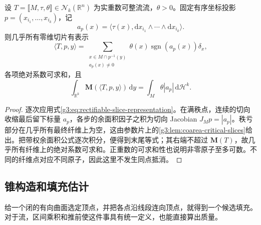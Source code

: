 \begin{corollary}\label{g3:cor:coordinate-slice-atoms}
	设 \(T=\lBrack M,\tau,\theta\rBrack\in\mathcal N_k(\mathbb R^n)\) 为实重数可整流流，\(\theta>0\)。固定有序坐标投影 \(p=(x_{i_1},\ldots,x_{i_k})\)，记
	\[
		a_p(x)=\langle\tau(x),\mathrm dx_{i_1}\wedge\cdots\wedge\mathrm dx_{i_k}\rangle.
	\]
	则几乎所有零维切片有表示
	\begin{equation}\label{g3:eq:coordinate-slice-atoms}
		\langle T,p,y\rangle
		=\sum_{\substack{x\in M\cap p^{-1}(y)\\a_p(x)\ne0}}
		\theta(x)\operatorname{sgn}(a_p(x))\delta_x,
	\end{equation}
	各项绝对系数可求和，且
	\[
		\int_{\mathbb R^k}\mathbf M(\langle T,p,y\rangle)\,\mathrm dy
		=\int_M\theta|a_p|\,\mathrm d\mathcal H^k.
	\]
\end{corollary}
\begin{proof}
	逐次应用式\eqref{g3:eq:rectifiable-slice-representation}。在满秩点，连续的切向收缩最后留下标量 \(a_p\)，各步的余面积因子之积为切向 Jacobian \(J_Mp=|a_p|\)。秩亏部分在几乎所有最终纤维上为空，这由参数片上的\cref{g3:lem:coarea-critical-slices}给出。把带权余面积公式逐次积分，便得到末尾等式；其右端不超过 \(\mathbf M(T)\)，故几乎所有纤维上的绝对系数可求和。正重数的可求和性也说明非零原子至多可数。不同的纤维点对应不同原子，因此这里不发生同点抵消。
\end{proof}

\subsection{锥构造和填充估计}
\label{g3:subsec:2203:02}
给一个闭的有向曲面选定顶点，并把各点沿线段连向顶点，就得到一个候选填充。对于流，区间乘积和推前使这件事具有统一定义，也能直接算出质量。

